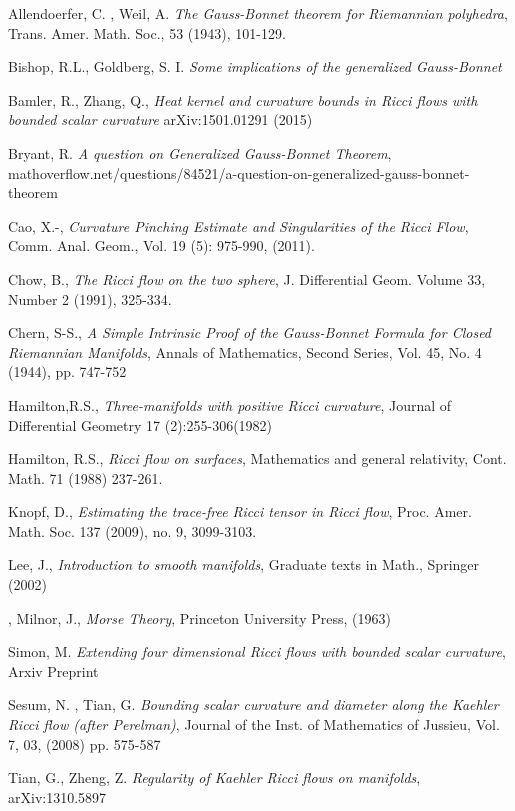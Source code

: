 \documentclass{amsart}
\numberwithin{equation}{section}
\theoremstyle{definition}
\theoremstyle{remark}
\begin{document}
\begin{thebibliography}{10}

 Allendoerfer, C. , Weil, A. 
\emph{ The Gauss-Bonnet theorem for Riemannian polyhedra}, 
Trans. Amer. Math. Soc., 53 (1943), 101-129.

 

 

 Bishop, R.L., Goldberg, S. I.
{\it Some implications of the generalized Gauss-Bonnet}

 Bamler, R., Zhang, Q., {\it Heat kernel and curvature
    bounds in Ricci flows with bounded scalar curvature}
 arXiv:1501.01291 (2015)

 Bryant, R. {\it A question on Generalized
    Gauss-Bonnet Theorem}, 
mathoverflow.net/questions/84521/a-question-on-generalized-gauss-bonnet-theorem

 
 

 Cao, X.-, \emph{Curvature Pinching Estimate and Singularities of the Ricci Flow},
Comm. Anal. Geom., Vol. 19 (5): 975-990, (2011).

 

  Chow, B.,
\emph{The Ricci  flow on the two sphere},
 J. Differential Geom.  Volume 33, Number 2 (1991), 325-334.

 
 

  Chern, S-S., \emph{A Simple Intrinsic Proof of the
    Gauss-Bonnet Formula for Closed Riemannian Manifolds}, 
Annals of Mathematics, Second Series, Vol. 45, No. 4 (1944), pp. 747-752

 

 

 

 

Hamilton,R.S.,
\emph{Three-manifolds with positive Ricci curvature},
Journal of Differential Geometry 17 (2):255-306(1982)

 Hamilton, R.S., 
\emph{ Ricci flow on surfaces}, Mathematics and general relativity,
Cont. Math. 71 (1988) 237-261.

 Knopf, D., \emph{Estimating the trace-free
    Ricci tensor in Ricci flow},
 Proc. Amer. Math. Soc. 137 (2009), no. 9, 3099-3103.

 Lee, J., \emph{Introduction to smooth manifolds},
  Graduate texts in Math., Springer (2002) 

 
 

, Milnor, J., \emph{Morse Theory},  Princeton
  University Press, (1963)

 Simon, M. \emph{Extending four dimensional Ricci flows with
  bounded scalar curvature}, 
Arxiv Preprint

 Sesum, N. , Tian, G. \emph{Bounding
    scalar curvature and diameter along the Kaehler Ricci flow (after
    Perelman)}, Journal of the Inst. of Mathematics of Jussieu,
  Vol. 7, 03, (2008) pp. 575-587

 Tian, G., Zheng, Z. \emph{Regularity of
    Kaehler Ricci flows on manifolds}, arXiv:1310.5897 

\end{thebibliography}
\end{document}
